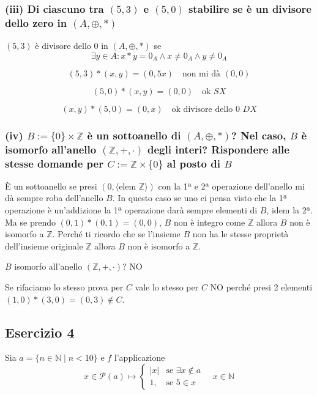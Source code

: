 \subsubsection*{(iii) Di ciascuno tra $(5,3)$ e $(5,0)$ stabilire se è un divisore dello zero in $(A, \oplus, *)$}

$(5,3)$ è divisore dello 0 in $(A, \oplus, *)$ se
$$\exists y \in A : x * y = 0_A \land x \neq 0_A \land y \neq 0_A$$

$$(5,3) * (x,y) = (0,5x) \quad \text{non mi dà } (0,0)$$

$$(5,0) * (x,y) = (0,0) \quad \text{ok } SX$$

$$(x,y) * (5,0) = (0,x) \quad \text{ok divisore dello 0 } DX$$

\subsubsection*{(iv) $B := \{0\} \times \mathbb{Z}$ è un sottoanello di $(A, \oplus, *)$? Nel caso, $B$ è isomorfo all'anello $(\mathbb{Z}, +, \cdot)$ degli interi? Rispondere alle stesse domande per $C := \mathbb{Z} \times \{0\}$ al posto di $B$}

È un sottoanello se presi $(0, \langle \text{elem } \mathbb{Z} \rangle)$ con la 1ª e 2ª operazione dell'anello mi dà sempre roba dell'anello $B$. In questo caso se uno ci pensa visto che la 1ª operazione è un'addizione la 1ª operazione darà sempre elementi di $B$, idem la 2ª. Ma se prendo $(0,1) * (0,1) = (0,0)$, $B$ non è integro come $\mathbb{Z}$ allora $B$ non è isomorfo a $\mathbb{Z}$. Perché ti ricordo che se l'insieme $B$ non ha le stesse proprietà dell'insieme originale $\mathbb{Z}$ allora $B$ non è isomorfo a $\mathbb{Z}$.

$B$ isomorfo all'anello $(\mathbb{Z}, +, \cdot)$? NO

Se rifaciamo lo stesso prova per $C$ vale lo stesso per $C$ NO perché presi 2 elementi $(1,0) * (3,0) = (0,3) \notin C$.

\subsection*{Esercizio 4}

Sia $a = \{n \in \mathbb{N} \mid n < 10\}$ e $f$ l'applicazione
$$x \in \mathcal{P}(a) \longmapsto \begin{cases}
|x| & \text{se } \exists x \notin a \\
1, & \text{se } 5 \in x
\end{cases} \quad x \in \mathbb{N}$$

